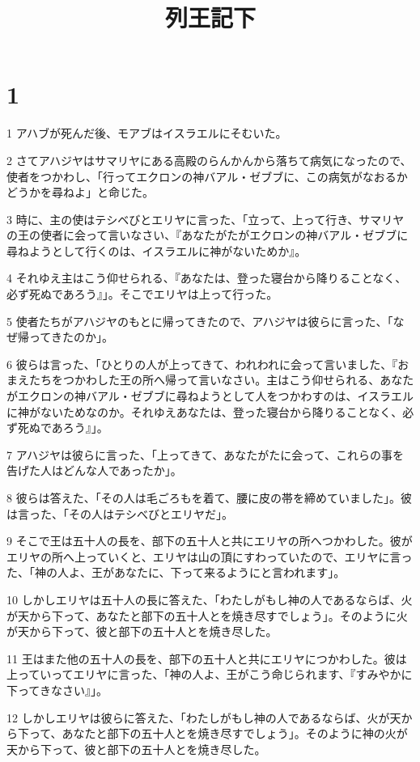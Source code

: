 

\title{列王記下}


\chapter{1}

\par 1 アハブが死んだ後、モアブはイスラエルにそむいた。
\par 2 さてアハジヤはサマリヤにある高殿のらんかんから落ちて病気になったので、使者をつかわし、「行ってエクロンの神バアル・ゼブブに、この病気がなおるかどうかを尋ねよ」と命じた。
\par 3 時に、主の使はテシベびとエリヤに言った、「立って、上って行き、サマリヤの王の使者に会って言いなさい、『あなたがたがエクロンの神バアル・ゼブブに尋ねようとして行くのは、イスラエルに神がないためか』。
\par 4 それゆえ主はこう仰せられる、『あなたは、登った寝台から降りることなく、必ず死ぬであろう』」。そこでエリヤは上って行った。
\par 5 使者たちがアハジヤのもとに帰ってきたので、アハジヤは彼らに言った、「なぜ帰ってきたのか」。
\par 6 彼らは言った、「ひとりの人が上ってきて、われわれに会って言いました、『おまえたちをつかわした王の所へ帰って言いなさい。主はこう仰せられる、あなたがエクロンの神バアル・ゼブブに尋ねようとして人をつかわすのは、イスラエルに神がないためなのか。それゆえあなたは、登った寝台から降りることなく、必ず死ぬであろう』」。
\par 7 アハジヤは彼らに言った、「上ってきて、あなたがたに会って、これらの事を告げた人はどんな人であったか」。
\par 8 彼らは答えた、「その人は毛ごろもを着て、腰に皮の帯を締めていました」。彼は言った、「その人はテシべびとエリヤだ」。
\par 9 そこで王は五十人の長を、部下の五十人と共にエリヤの所へつかわした。彼がエリヤの所へ上っていくと、エリヤは山の頂にすわっていたので、エリヤに言った、「神の人よ、王があなたに、下って来るようにと言われます」。
\par 10 しかしエリヤは五十人の長に答えた、「わたしがもし神の人であるならば、火が天から下って、あなたと部下の五十人とを焼き尽すでしょう」。そのように火が天から下って、彼と部下の五十人とを焼き尽した。
\par 11 王はまた他の五十人の長を、部下の五十人と共にエリヤにつかわした。彼は上っていってエリヤに言った、「神の人よ、王がこう命じられます、『すみやかに下ってきなさい』」。
\par 12 しかしエリヤは彼らに答えた、「わたしがもし神の人であるならば、火が天から下って、あなたと部下の五十人とを焼き尽すでしょう」。そのように神の火が天から下って、彼と部下の五十人とを焼き尽した。
